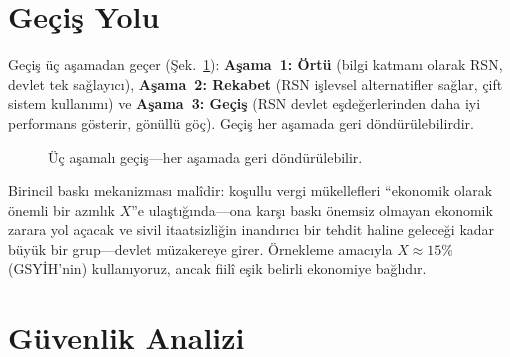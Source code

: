 \documentclass[11pt,a4paper,twocolumn]{article}
\begin{document}
\section{Geçiş Yolu}

Geçiş üç aşamadan geçer (Şek.~\ref{fig:migration}): \textbf{Aşama~1: Örtü} (bilgi katmanı olarak RSN, devlet tek sağlayıcı), \textbf{Aşama~2: Rekabet} (RSN işlevsel alternatifler sağlar, çift sistem kullanımı) ve \textbf{Aşama~3: Geçiş} (RSN devlet eşdeğerlerinden daha iyi performans gösterir, gönüllü göç). Geçiş her aşamada geri döndürülebilirdir.

\begin{figure}[ht]
\centering
{}
\caption{Üç aşamalı geçiş---her aşamada geri döndürülebilir.}
\label{fig:migration}
\end{figure}

Birincil baskı mekanizması malîdir: koşullu vergi mükellefleri ``ekonomik olarak önemli bir azınlık $X$''e ulaştığında---ona karşı baskı önemsiz olmayan ekonomik zarara yol açacak ve sivil itaatsizliğin inandırıcı bir tehdit haline geleceği kadar büyük bir grup---devlet müzakereye girer. Örnekleme amacıyla $X \approx 15\%$ (GSYİH'nin) kullanıyoruz, ancak fiilî eşik belirli ekonomiye bağlıdır.

\section{Güvenlik Analizi}
\end{document}
